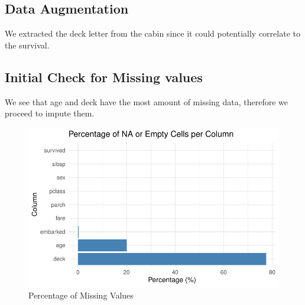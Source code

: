 \documentclass[
  letterpaper,
  DIV=11,
  numbers=noendperiod]{scrartcl}
\newenvironment{Shaded}{\begin{snugshade}}{\end{snugshade}}
\newcommand{\CommentTok}[1]{\textcolor[rgb]{0.37,0.37,0.37}{#1}}
\newcommand{\ConstantTok}[1]{\textcolor[rgb]{0.56,0.35,0.01}{#1}}
\newcommand{\DecValTok}[1]{\textcolor[rgb]{0.68,0.00,0.00}{#1}}
\newcommand{\FunctionTok}[1]{\textcolor[rgb]{0.28,0.35,0.67}{#1}}
\newcommand{\NormalTok}[1]{\textcolor[rgb]{0.00,0.23,0.31}{#1}}
\newcommand{\OtherTok}[1]{\textcolor[rgb]{0.00,0.23,0.31}{#1}}
\newcommand{\SpecialCharTok}[1]{\textcolor[rgb]{0.37,0.37,0.37}{#1}}
\begin{document}
\subsection{Data Augmentation}\label{data-augmentation}

We extracted the deck letter from the cabin since it could potentially
correlate to the survival.

\begin{Shaded}
\end{Shaded}

\subsection{Initial Check for Missing
values}\label{initial-check-for-missing-values}

We see that age and deck have the most amount of missing data, therefore
we proceed to impute them.

\begin{figure}[H]

{\centering \includegraphics{FinalProject_files/figure-pdf/unnamed-chunk-4-1.pdf}

}

\caption{Percentage of Missing Values}

\end{figure}%
\end{document}
